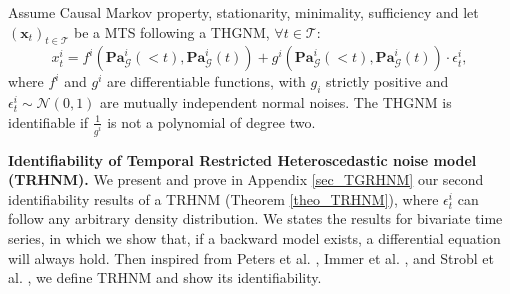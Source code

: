 \begin{mybox}
\begin{theorem}
Assume Causal Markov property, stationarity, minimality, sufficiency and let $(\boldsymbol{x}_t)_{t \in \mathcal{T}}$ be a MTS following a THGNM, $\forall t \in \mathcal{T}$:
\begin{equation}
  x_t^i= f^i\left(\mathbf{P a}_{\mathcal{G}}^i(<t), \mathbf{P a}_{\mathcal{G}}^i(t)\right)+g^i\left(\mathbf{P a}_{\mathcal{G}}^i(<t), \mathbf{P a}_{\mathcal{G}}^i(t)\right)\cdot\epsilon_t^{i},
\label{eq_hetero_gaussian}
\end{equation}  
where $f^i$ and $g^i$ are differentiable functions, with $g_i$ strictly positive and $\epsilon^{i}_t \sim \mathcal{N}(0,1)$ are mutually independent normal noises. The THGNM is identifiable if $\frac{1}{g^i}$ is not a polynomial of degree two. 
\label{theo_THGNM}
\end{theorem}
\end{mybox}
\textbf{Identifiability of Temporal Restricted Heteroscedastic noise model (TRHNM).} We present and prove
in Appendix \ref{sec_TGRHNM} our second identifiability results of a TRHNM (Theorem \ref{theo_TRHNM}), where $\epsilon^{i}_t$ can follow any arbitrary density distribution. We states the results for bivariate time series, in which we show that, if a backward model exists, a differential equation will always hold. Then inspired from Peters et al. \citep{peters2014causal}, Immer et al. \citep{immer2023identifiability}, and Strobl et al. \citep{strobl2023identifying}, we define TRHNM and show its identifiability.

